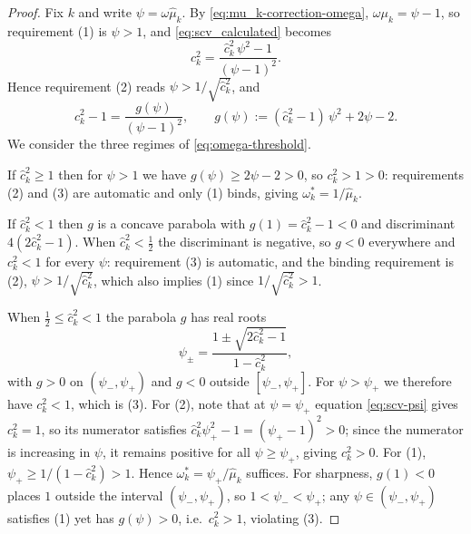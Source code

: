 \documentclass[10pt,a4paper]{amsart}
\begin{document}
\setcounter{section}{7}
\setcounter{equation}{7}
\setcounter{conjecture}{0}
\setcounter{corollary}{1}
\setcounter{definition}{0}
\setcounter{example}{1}
\setcounter{lemma}{3}
\setcounter{proposition}{8}
\setcounter{remark}{0}
\setcounter{theorem}{0}
\begin{proof}
Fix $k$ and write $\psi = \omega\hat{\mu}_k$. By \eqref{eq:mu_k-correction-omega}, $\omega\mu_k = \psi - 1$, so requirement (1) is $\psi > 1$, and \eqref{eq:scv_calculated} becomes
\begin{equation}
\label{eq:scv-psi}
c_k^2 = \frac{\hat{c}_k^2\,\psi^2 - 1}{(\psi-1)^2}.
\end{equation}
Hence requirement (2) reads $\psi > 1/\sqrt{\hat{c}_k^2}$, and
\[
c_k^2 - 1 = \frac{g(\psi)}{(\psi-1)^2},
\qquad
g(\psi) := (\hat{c}_k^2-1)\,\psi^2 + 2\psi - 2 .
\]
We consider the three regimes of \eqref{eq:omega-threshold}.

If $\hat{c}_k^2 \ge 1$ then for $\psi > 1$ we have $g(\psi) \ge 2\psi - 2 > 0$, so $c_k^2 > 1 > 0$: requirements (2) and (3) are automatic and only (1) binds, giving $\omega^*_k = 1/\hat{\mu}_k$.

If $\hat{c}_k^2 < 1$ then $g$ is a concave parabola with $g(1) = \hat{c}_k^2 - 1 < 0$ and discriminant $4(2\hat{c}_k^2-1)$. When $\hat{c}_k^2 < \tfrac12$ the discriminant is negative, so $g < 0$ everywhere and $c_k^2 < 1$ for every $\psi$: requirement (3) is automatic, and the binding requirement is (2), $\psi > 1/\sqrt{\hat{c}_k^2}$, which also implies (1) since $1/\sqrt{\hat{c}_k^2} > 1$.

When $\tfrac12 \le \hat{c}_k^2 < 1$ the parabola $g$ has real roots
\[
\psi_\pm = \frac{1 \pm \sqrt{2\hat{c}_k^2-1}}{1-\hat{c}_k^2},
\]
with $g > 0$ on $(\psi_-,\psi_+)$ and $g < 0$ outside $[\psi_-,\psi_+]$. For $\psi > \psi_+$ we therefore have $c_k^2 < 1$, which is (3). For (2), note that at $\psi = \psi_+$ equation \eqref{eq:scv-psi} gives $c_k^2 = 1$, so its numerator satisfies $\hat{c}_k^2\psi_+^2 - 1 = (\psi_+-1)^2 > 0$; since the numerator is increasing in $\psi$, it remains positive for all $\psi \ge \psi_+$, giving $c_k^2 > 0$. For (1), $\psi_+ \ge 1/(1-\hat{c}_k^2) > 1$. Hence $\omega^*_k = \psi_+/\hat{\mu}_k$ suffices. For sharpness, $g(1) < 0$ places $1$ outside the interval $(\psi_-,\psi_+)$, so $1 < \psi_- < \psi_+$; any $\psi \in (\psi_-,\psi_+)$ satisfies (1) yet has $g(\psi) > 0$, i.e.\ $c_k^2 > 1$, violating (3).
\end{proof}
\end{document}

